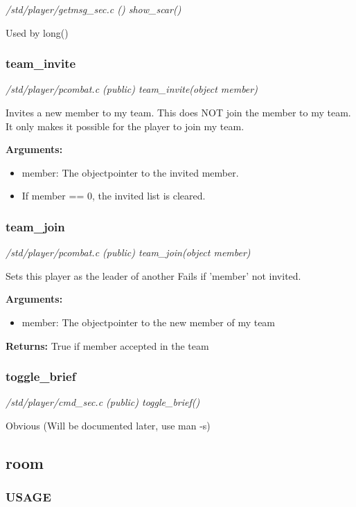 {\em /std/player/getmsg\_sec.c () show\_scar()}

Used by long()


\subsubsection{team\_invite}

{\em /std/player/pcombat.c (public) team\_invite(object member)}

Invites a new member to my team. This does NOT join the
member to my team. It only makes it possible for the player
to join my team.

{\bf Arguments:}
\begin{itemize}
\item     member: The objectpointer to the invited member.
\item If member == 0, the invited list is cleared.
\end{itemize}


\subsubsection{team\_join}

{\em /std/player/pcombat.c (public) team\_join(object member)}

Sets this player as the leader of another
Fails if 'member' not invited.

{\bf Arguments:}
\begin{itemize}
\item     member: The objectpointer to the new member of my team
\end{itemize}

{\bf Returns:}        True if member accepted in the team


\subsubsection{toggle\_brief}

{\em /std/player/cmd\_sec.c (public) toggle\_brief()}

Obvious (Will be documented later, use man -s)


\subsection{room}
\subsubsection{USAGE}

